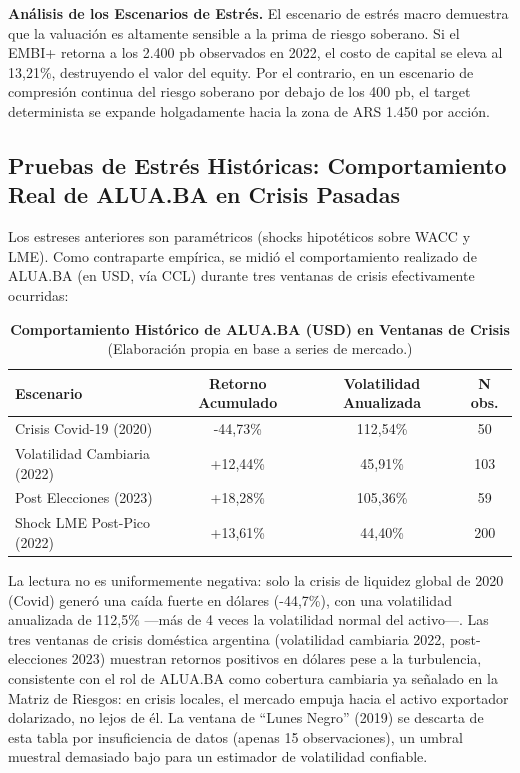 \documentclass[10pt,a4paper]{article}
\begin{document}
\textbf{Análisis de los Escenarios de Estrés.} El escenario de estrés macro demuestra que la valuación es altamente sensible a la prima de riesgo soberano. Si el EMBI+ retorna a los 2.400 pb observados en 2022, el costo de capital se eleva al 13,21\%, destruyendo el valor del equity. Por el contrario, en un escenario de compresión continua del riesgo soberano por debajo de los 400 pb, el target determinista se expande holgadamente hacia la zona de ARS 1.450 por acción.

\subsection{Pruebas de Estrés Históricas: Comportamiento Real de ALUA.BA en Crisis Pasadas}
Los estreses anteriores son paramétricos (shocks hipotéticos sobre WACC y LME). Como contraparte empírica, se midió el comportamiento realizado de ALUA.BA (en USD, vía CCL) durante tres ventanas de crisis efectivamente ocurridas:

\begin{table}[H]
\centering
\caption{\textbf{Comportamiento Histórico de ALUA.BA (USD) en Ventanas de Crisis} {\small\color{gsgray} (Elaboración propia en base a series de mercado.)}}
\small
\begin{tabular}{lccc}
\toprule
\textbf{Escenario} & \textbf{Retorno Acumulado} & \textbf{Volatilidad Anualizada} & \textbf{N obs.} \\
\midrule
Crisis Covid-19 (2020) & -44,73\% & 112,54\% & 50 \\
Volatilidad Cambiaria (2022) & +12,44\% & 45,91\% & 103 \\
Post Elecciones (2023) & +18,28\% & 105,36\% & 59 \\
Shock LME Post-Pico (2022) & +13,61\% & 44,40\% & 200 \\
\bottomrule
\end{tabular}
\end{table}

La lectura no es uniformemente negativa: solo la crisis de liquidez global de 2020 (Covid) generó una caída fuerte en dólares (-44,7\%), con una volatilidad anualizada de 112,5\% —más de 4 veces la volatilidad normal del activo—. Las tres ventanas de crisis doméstica argentina (volatilidad cambiaria 2022, post-elecciones 2023) muestran retornos positivos en dólares pese a la turbulencia, consistente con el rol de ALUA.BA como cobertura cambiaria ya señalado en la Matriz de Riesgos: en crisis locales, el mercado empuja hacia el activo exportador dolarizado, no lejos de él. La ventana de ``Lunes Negro'' (2019) se descarta de esta tabla por insuficiencia de datos (apenas 15 observaciones), un umbral muestral demasiado bajo para un estimador de volatilidad confiable.
\end{document}

